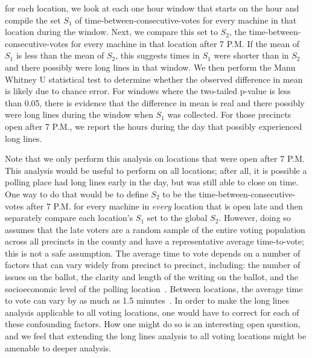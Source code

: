 \documentclass[letterpaper,twocolumn,10pt]{article}
\begin{document}
for each location, we look at each one hour window that starts on the hour and
compile the set $S_1$ of time-between-consecutive-votes for every machine in
that location during the window. Next, we compare this set to $S_2$, the
time-between-consecutive-votes for every machine in that location after 7
P.M. If the mean of $S_1$ is less than the mean of $S_2$, this suggests times in
$S_1$ were shorter than in $S_2$ and there possibly were long lines in that
window. We then perform the Mann Whitney U statistical test to determine whether
the observed difference in mean is likely due to chance error. For windows where the
two-tailed p-value is less than 0.05, there is evidence that the difference in
mean is real and there possibly were long lines during the window when $S_1$ was
collected. For those precincts open after 7 P.M., we report the hours during the
day that possibly experienced long lines.

Note that we only perform this analysis on locations that were open
after 7 P.M. This analysis would be useful to perform on all locations; after all, it is possible a polling place had long lines early in the day, but
was still able to close on time. One way to do that would be to define $S_2$ to
be the time-between-consecutive-votes after 7 P.M. for every machine in
\emph{every} location that is open late and then separately compare each location's $S_1$
set to the global $S_2$. However, doing so assumes that
the late voters are a random sample of the entire voting population across all
precincts in the county and have a representative average time-to-vote; this is
not a safe assumption. The average time to vote depends on a number of factors
that can vary widely from precinct to precinct, including: the number of issues
on the ballot, the clarity and length of the writing on the ballot, and the
socioeconomic level of the polling location~\cite{Spencer2010,
  Allen2006}. Between locations, the average time to vote can vary by as much as
1.5 minutes~\cite{Spencer2010}. In order to make the long lines analysis
applicable to all voting locations, one would have to correct for each
of these confounding factors. How one might do so is an interesting open
question, and we feel that extending the long lines analysis to all voting locations
might be amenable to deeper analysis.
\end{document}
